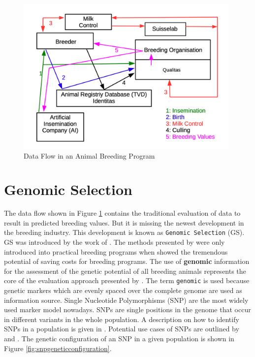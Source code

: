 \documentclass[
]{book}
\theoremstyle{definition}
\theoremstyle{definition}
\theoremstyle{definition}
\theoremstyle{remark}
\begin{document}
\begin{figure}
\includegraphics[width=11cm]{odg/datacollectionflow} \caption{Data Flow in an Animal Breeding Program}\label{fig:datacollectionflow}
\end{figure}

\hypertarget{asm-genomic-selection}{%
\section{Genomic Selection}\label{asm-genomic-selection}}

The data flow shown in Figure \ref{fig:datacollectionflow} contains the traditional evaluation of data to result in predicted breeding values. But it is missing the newest development in the breeding industry. This development is known as \texttt{Genomic\ Selection} (GS). GS was introduced by the work of \citep{Meuwissen2001}. The methods presented by \citep{Meuwissen2001} were only introduced into practical breeding programs when \citep{Schaeffer2006} showed the tremendous potential of saving costs for breeding programs. The use of \textbf{genomic} information for the assessment of the genetic potential of all breeding animals represents the core of the evaluation approach presented by \citep{Meuwissen2001}. The term \texttt{genomic} is used because genetic markers which are evenly spaced over the complete genome are used as information source. Single Nucleotide Polymorphisms (SNP) are the most widely used marker model nowadays. SNPs are single positions in the genome that occur in different variants in the whole population. A description on how to identify SNPs in a population is given in \citep{Czech2018}. Potential use cases of SNPs are outlined by \citep{SeidelJr.2010} and \citep{Pant2012}. The genetic configuration of an SNP in a given population is shown in Figure \ref{fig:snpgeneticconfiguration}.
\end{document}
